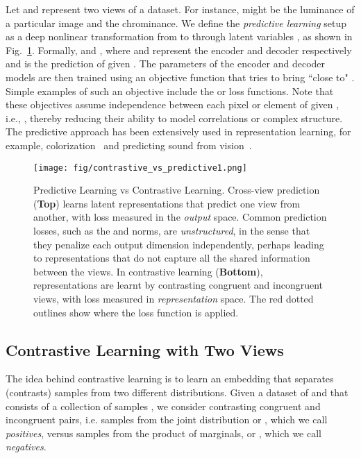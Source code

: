 \documentclass[10pt,twocolumn,letterpaper]{article}
\newcommand{\citep}[1]{\cite{#1}}
\begin{document}
Let  and  represent two views of a dataset. For instance,  might be the luminance of a particular image and  the chrominance. We define the \emph{predictive learning} setup as a deep nonlinear transformation from  to  through latent variables , as shown in Fig.~\ref{fig:pred_contrast}. Formally,  and , where  and  represent the encoder and decoder respectively and  is the prediction of  given . The parameters of the encoder and decoder models are then trained using an objective function that tries to bring  ``close to" . Simple examples of such an objective include the  or  loss functions. Note that these objectives assume independence between each pixel or element of  given , i.e., , thereby reducing their ability to model correlations or complex structure. The predictive approach has been extensively used in representation learning, for example, colorization~\citep{zhang2016colorful,zhang2017split} and predicting sound from vision~\citep{owens2016visually}. \begin{figure}[t]
\centering
\texttt{[image: fig/contrastive\_vs\_predictive1.png]}
\caption{\small{Predictive Learning vs Contrastive Learning. Cross-view prediction (\textbf{Top}) learns latent representations that predict one view from another, with loss measured in the \emph{output} space. Common prediction losses, such as the  and  norms, are \emph{unstructured}, in the sense that they penalize each output dimension independently, perhaps leading to representations that do not capture all the shared information between the views. In contrastive learning (\textbf{Bottom}), representations are learnt by contrasting congruent and incongruent views, with loss measured in \emph{representation} space. The red dotted outlines show where the loss function is applied.}}
\label{fig:pred_contrast}

\end{figure} \subsection{Contrastive Learning with Two Views}
\label{sec:contrast_two}

The idea behind contrastive learning is to learn an embedding that separates (contrasts) samples from two different distributions.
Given a dataset of  and  that consists of a collection of samples , we consider contrasting congruent and incongruent pairs, i.e. samples from the joint distribution  or , which we call \emph{positives}, versus samples from the product of marginals,  or , which we call \emph{negatives}.
\end{document}
